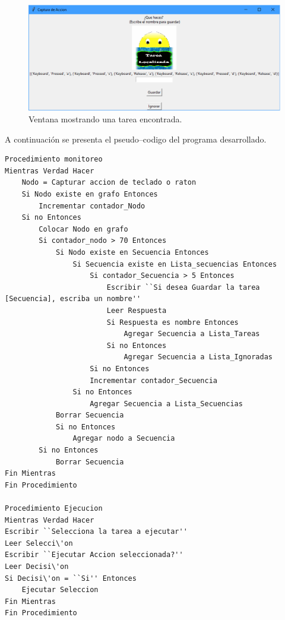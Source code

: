 \begin{figure}[!h]
\centering
\includegraphics[width=0.9\columnwidth]{chap4/Imagenes/ventana2.eps}
\caption{Ventana mostrando una tarea encontrada.}
\label{fig:v02}
\end{figure}

A continuaci\'on se presenta el pseudo--codigo del programa desarrollado.

\begin{table}[]
\begin{lstlisting}
Procedimiento monitoreo
Mientras Verdad Hacer
    Nodo = Capturar accion de teclado o raton
    Si Nodo existe en grafo Entonces
        Incrementar contador_Nodo
    Si no Entonces
		Colocar Nodo en grafo
		Si contador_nodo > 70 Entonces
			Si Nodo existe en Secuencia Entonces
				Si Secuencia existe en Lista_secuencias Entonces
					Si contador_Secuencia > 5 Entonces
						Escribir ``Si desea Guardar la tarea [Secuencia], escriba un nombre''
						Leer Respuesta
						Si Respuesta es nombre Entonces
							Agregar Secuencia a Lista_Tareas
						Si no Entonces 
							Agregar Secuencia a Lista_Ignoradas
					Si no Entonces
					Incrementar contador_Secuencia
				Si no Entonces
					Agregar Secuencia a Lista_Secuencias
            Borrar Secuencia
            Si no Entonces
		        Agregar nodo a Secuencia
		Si no Entonces
            Borrar Secuencia
Fin Mientras
Fin Procedimiento 

Procedimiento Ejecucion
Mientras Verdad Hacer
Escribir ``Selecciona la tarea a ejecutar''
Leer Selecci\'on
Escribir ``Ejecutar Accion seleccionada?''
Leer Decisi\'on
Si Decisi\'on = ``Si'' Entonces
	Ejecutar Seleccion
Fin Mientras
Fin Procedimiento

\end{lstlisting}
\end{table}